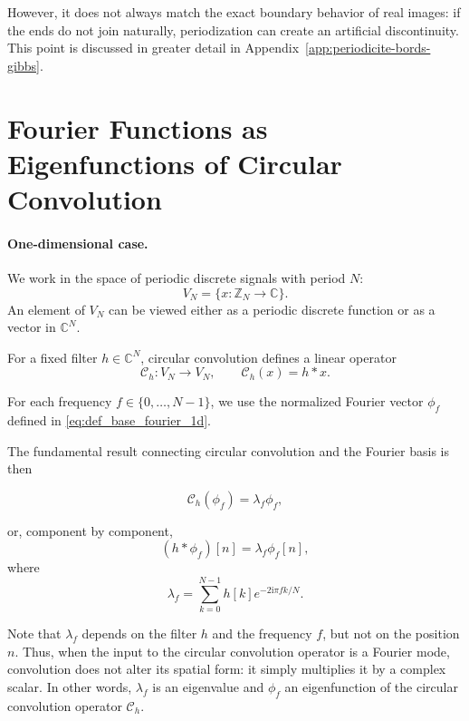 However, it does not always match the exact boundary behavior of real images:
if the ends do not join naturally, periodization can create an artificial
discontinuity. This point is discussed in greater detail in Appendix~\ref{app:periodicite-bords-gibbs}.

\section{Fourier Functions as Eigenfunctions of Circular Convolution}
\label{sec:fourier-vecteurs-propres}

\paragraph{One-dimensional case.}

We work in the space of periodic discrete signals with period $N$:
\[
V_N = \{x : \mathbb{Z}_N \rightarrow \mathbb{C}\}.
\]
An element of $V_N$ can be viewed either as a periodic discrete function or as a vector in $\mathbb{C}^N$.

For a fixed filter $h \in \mathbb{C}^N$, circular convolution defines a linear operator
\[
\mathcal{C}_h : V_N \rightarrow V_N,
\qquad
\mathcal{C}_h(x) = h * x.
\]

For each frequency $f \in \{0,\dots,N-1\}$, we use the normalized Fourier vector
$\phi_f$ defined in \eqref{eq:def_base_fourier_1d}.

The fundamental result connecting circular convolution and the Fourier basis is then

\begin{equation}
\mathcal{C}_h(\phi_f) = \lambda_f \phi_f,
\label{eq:fourier_fonction_propre_conv_1d}
\end{equation}

or, component by component,
\[
(h * \phi_f)[n] = \lambda_f \phi_f[n],
\]
where
\[
\lambda_f =
\sum_{k=0}^{N-1} h[k] e^{-2\mathrm{i}\pi f k/N}.
\]

Note that $\lambda_f$ depends on the filter $h$ and the frequency $f$,
but not on the position $n$. Thus, when the input to the circular convolution operator
is a Fourier mode, convolution does not alter its spatial form: it simply
multiplies it by a complex scalar. In other words, $\lambda_f$ is an eigenvalue and
$\phi_f$ an eigenfunction of the circular convolution operator
$\mathcal{C}_h$.

